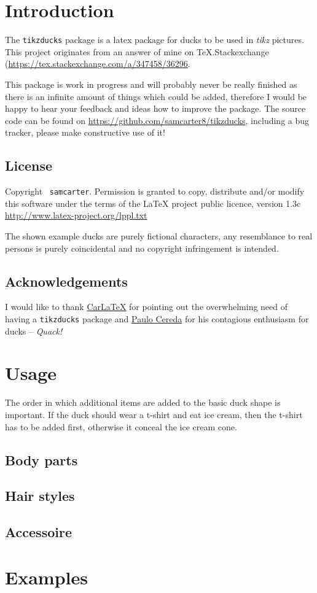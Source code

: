 \documentclass{ltxdockit}
\newcommand{\tikzducks}{\texttt{tikzducks}\xspace}
\begin{document}
\printtitlepage

\section{Introduction}
\label{intro}

The \tikzducks package is a latex package for ducks to be used in \emph{tikz} pictures. This project originates from an answer of mine on TeX.Stackexchange (\url{https://tex.stackexchange.com/a/347458/36296}.

This package is work in progress and will probably never be really finished as there is an infinite amount of things which could be added, therefore I would be happy to hear your feedback and ideas how to improve the package. The source code can be found on \url{https://github.com/samcarter8/tikzducks}, including a bug tracker, please make constructive use of it!

\subsection{License}

Copyright \textcopyright\ \texttt{samcarter}. Permission is granted to copy, distribute and\slash or modify this software under the terms of the LaTeX project public licence, version 1.3c \url{http://www.latex-project.org/lppl.txt}

The shown example ducks are purely fictional characters, any resemblance to real persons is purely coincidental and no copyright infringement is intended.

\subsection{Acknowledgements}

I would like to thank \href{https://tex.stackexchange.com/users/101651/carlatex}{CarLaTeX} for pointing out the overwhelming need of having a \tikzducks package and \href{https://tex.stackexchange.com/users/3094/paulo-cereda}{Paulo Cereda} for his contagious enthusiasm for ducks -- \emph{Quack!}

\section{Usage}

The order in which additional items are added to the basic duck shape is important. If the duck should wear a t-shirt and eat ice cream, then the t-shirt has to be added first, otherwise it conceal the ice cream cone.
 
\subsection{Body parts}

\subsection{Hair styles}

\subsection{Accessoire}

\section{Examples}
\end{document}
